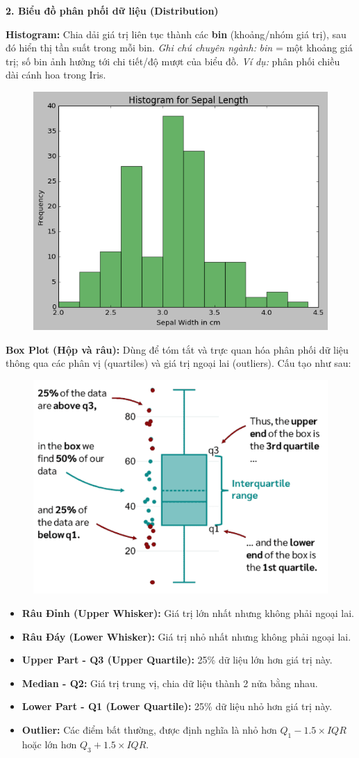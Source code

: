\documentclass[11pt]{article}
\begin{document}
\medskip
\noindent \textbf{2. Biểu đồ phân phối dữ liệu (Distribution)}

\medskip
\textbf{Histogram:} Chia dải giá trị liên tục thành các \textbf{bin} (khoảng/nhóm giá trị), sau đó hiển thị tần suất trong mỗi bin.
\textit{Ghi chú chuyên ngành:} \emph{bin} = một khoảng giá trị; số bin ảnh hưởng tới chi tiết/độ mượt của biểu đồ.
\textit{Ví dụ:} phân phối chiều dài cánh hoa trong Iris.
\begin{figure}[H]
    \centering
    \includegraphics[width=0.4\linewidth]{images/Histogram.png}
\end{figure}

\medskip
\textbf{Box Plot (Hộp và râu):} Dùng để tóm tắt và trực quan hóa phân phối dữ liệu thông qua các phân vị (quartiles) và giá trị ngoại lai (outliers). Cấu tạo như sau:
\begin{figure}[H]
    \centering
    \includegraphics[width=0.5\linewidth]{images/boxplot_img.png}
\end{figure}
\begin{itemize}
    \item \textbf{Râu Đỉnh (Upper Whisker):} Giá trị lớn nhất nhưng không phải ngoại lai.
    \item \textbf{Râu Đáy (Lower Whisker):} Giá trị nhỏ nhất nhưng không phải ngoại lai.
    \item \textbf{Upper Part - Q3 (Upper Quartile):} 25\% dữ liệu lớn hơn giá trị này.
    \item \textbf{Median - Q2:} Giá trị trung vị, chia dữ liệu thành 2 nửa bằng nhau.
    \item \textbf{Lower Part - Q1 (Lower Quartile):} 25\% dữ liệu nhỏ hơn giá trị này.
    \item \textbf{Outlier:} Các điểm bất thường, được định nghĩa là nhỏ hơn $Q_{1} - 1.5 \times IQR$ hoặc lớn hơn $Q_{3} + 1.5 \times IQR$.
\end{itemize}
\end{document}
